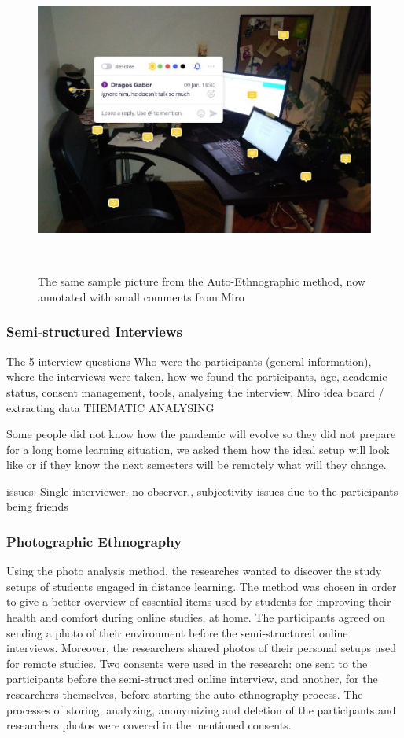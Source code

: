 \documentclass{sigchi}
\begin{document}
\begin{figure}
\centering
  \includegraphics[width=1\columnwidth]{figures/auto-ethnography-annotated.JPG}
  \caption{The same sample picture from the Auto-Ethnographic method, now annotated with small comments from Miro}~\label{fig:figure2}
\end{figure}

\subsubsection{Semi-structured Interviews}
The 5 interview questions
Who were the participants (general information), where the interviews were taken, how we found the participants, age, academic status, consent management, tools, analysing the interview, Miro idea board / extracting data THEMATIC ANALYSING 

Some people did not know how the pandemic will evolve so they did not prepare for a long home learning situation, we asked them how the ideal setup will look like or if they know the next semesters  will be remotely what will they change.

issues: Single interviewer, no observer., subjectivity issues due to the participants being friends

\subsubsection{Photographic Ethnography}
Using the photo analysis method, the researches wanted to discover the study setups of students engaged in distance learning. The method was chosen in order to give a better overview of essential items used by students for improving their health and comfort during online studies, at home. The participants agreed on sending a photo of their environment before the semi-structured online interviews. Moreover, the researchers shared photos of their personal setups used for remote studies. Two consents were used in the research: one sent to the participants before the semi-structured online interview, and another, for the researchers themselves, before starting the auto-ethnography process. The processes of storing, analyzing, anonymizing and deletion of the participants and researchers photos were covered in the mentioned consents.
\end{document}
